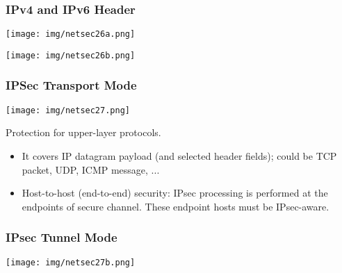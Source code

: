 \documentclass[a4paper, 10pt, titlepage]{article}
\begin{document}
\subsubsection*{IPv4 and IPv6 Header}
\begin{minipage}{0.45\textwidth}
	\begin{center}
		\texttt{[image: img/netsec26a.png]}
	\end{center}
\end{minipage}
\hfill
\begin{minipage}{0.45\textwidth}
	\begin{center}
		\texttt{[image: img/netsec26b.png]}
	\end{center}
\end{minipage}

\subsubsection{IPSec Transport Mode}
\begin{minipage}{0.5\textwidth}
	\begin{center}
		\texttt{[image: img/netsec27.png]}
	\end{center}
\end{minipage}
\hfill
\begin{minipage}{0.45\textwidth}
Protection for upper-layer protocols. 
\begin{itemize}
	\item It covers IP datagram payload (and selected header fields); could be TCP packet, UDP, ICMP message, ...
	\item Host-to-host (end-to-end) security: IPsec processing is performed at the endpoints of secure channel. These endpoint hosts must be IPsec-aware.
\end{itemize}
\end{minipage}

\subsubsection{IPsec Tunnel Mode}
	\begin{center}
		\texttt{[image: img/netsec27b.png]}
	\end{center}
\end{document}
